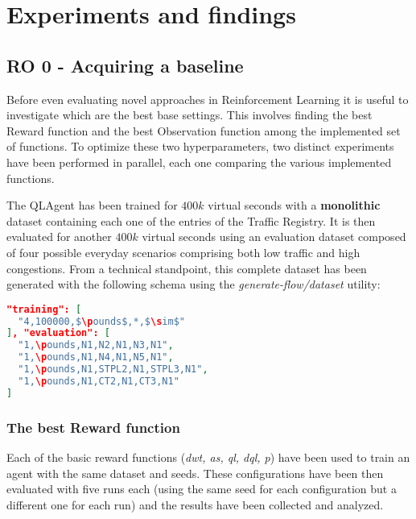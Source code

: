 \chapter{Experiments and findings}

\section{RO 0 - Acquiring a baseline}
  
  Before even evaluating novel approaches in Reinforcement Learning it is useful to investigate which are the best base settings. This involves finding the best Reward function and the best Observation function among the implemented set of functions. To optimize these two hyperparameters, two distinct experiments have been performed in parallel, each one comparing the various implemented functions.

  The QLAgent has been trained for $400k$ virtual seconds with a \textbf{monolithic} dataset containing each one of the entries of the Traffic Registry. It is then evaluated for another $400k$ virtual seconds using an evaluation dataset composed of four possible everyday scenarios comprising both low traffic and high congestions. From a technical standpoint, this complete dataset has been generated with the following schema using the \textit{generate-flow/dataset} utility:

\noindent
\begin{minipage}{\linewidth}
\begin{lstlisting}[language=JSON, caption=The schema for the "Monolithic" Dataset, label={lst:dataset-schema-monolithic}, mathescape=true]
"training": [
  "4,100000,$\pounds$,*,$\sim$"
], "evaluation": [
  "1,\pounds,N1,N2,N1,N3,N1",
  "1,\pounds,N1,N4,N1,N5,N1",
  "1,\pounds,N1,STPL2,N1,STPL3,N1",
  "1,\pounds,N1,CT2,N1,CT3,N1"
]
\end{lstlisting}
\end{minipage}

\subsection{The best Reward function}

Each of the basic reward functions (\textit{dwt, as, ql, dql, p}) have been used to train an agent with the same dataset and seeds.
These configurations have been then evaluated with five runs each (using the same seed for each configuration but a different one for each run) and the results have been collected and analyzed.

